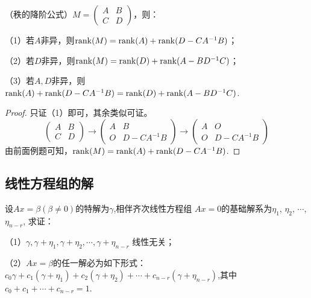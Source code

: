 \begin{example}
  （秩的降阶公式）\( M=\begin{pmatrix}
    A & B\\
    C & D\end{pmatrix}\)，则：

  （1）若\(A\)非异，则\(\operatorname{rank}(M)=\operatorname{rank}(A)+\operatorname{rank}(D-CA^{-1}B)\)；

  （2）若\(D\)非异，则\(\operatorname{rank}(M)=\operatorname{rank}(D)+\operatorname{rank}(A-BD^{-1}C)\)；

  （3）若\(A,D\)非异，则\(\operatorname{rank}(A)+\operatorname{rank}(D-CA^{-1}B)=\operatorname{rank}(D)+\operatorname{rank}(A-BD^{-1}C)\).
\end{example}

\begin{proof}
  只证（1）即可，其余类似可证。
  \[\begin{pmatrix}
      A & B\\
      C & D\end{pmatrix}\longrightarrow \begin{pmatrix}
      A & B\\
      O & D-CA^{-1}B\end{pmatrix}\longrightarrow \begin{pmatrix}
      A & O\\
      O & D-CA^{-1}B\end{pmatrix}\]
  由前面例题可知，\(\operatorname{rank}(M)=\operatorname{rank}(A)+\operatorname{rank}(D-CA^{-1}B)\).
\end{proof}

\subsection{线性方程组的解}
\begin{example}
  设\(Ax=\beta(\beta\neq 0)\)的特解为\(\gamma\),相伴齐次线性方程组
  \(Ax=0\)的基础解系为$\eta_1$, $\eta_2$, $\cdots$, $\eta_{n-r}$, 求证：

  （1）\(\gamma, \gamma+\eta_1, \gamma+\eta_2, \cdots, \gamma+\eta_{n-r}\)
  线性无关；

  （2）\(Ax=\beta\)的任一解必为如下形式：
  \(c_0\gamma+c_1(\gamma+\eta_1)+c_2(\gamma+\eta_2)+
  \cdots+c_{n-r}(\gamma+\eta_{n-r})\),其中\(c_0+c_1+\cdots+c_{n-r}=1\).
\end{example}

